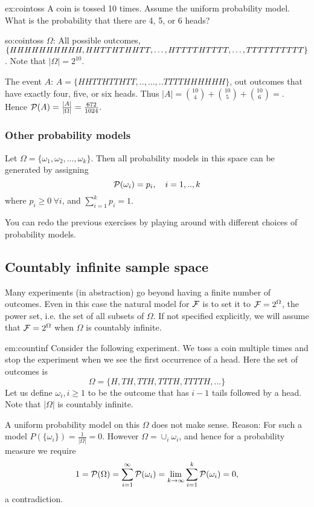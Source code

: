 \begin{excr}{ex:cointoss}
A coin is tossed 10 times. Assume the uniform probability model. What is the probability that there are 4, 5, or 6 heads?
\end{excr}
\begin{soln}{so:cointoss}
$\Omega$: All possible outcomes, $\{ HHHHHHHHHH, HHTTHTHHTT, \dots,\\ HTTTTHTTTT, \ldots, TTTTTTTTTT\}$. Note that $|\Omega|=2^{10}$.

The event $A$: $A=\{HHTTHTTHTT,..,\ldots,..TTTTHHHHHH \}$, out outcomes that have exactly four, five, or six heads. Thus $|A| = \binom{10}{4} + \binom{10}{5} + \binom{10}{6} = $.
Hence $\mathcal{P}(A) = \frac{|A|}{|\Omega|} = \frac{672}{1024}. $
\end{soln}

\subsubsection{Other probability models}

Let $\Omega=\{\omega_1, \omega_2, \ldots, \omega_k\}$. Then all probability models in this space can be generated by assigning
$$ \mathcal{P}(\omega_i)=p_i, ~~~i=1,..,k$$
where $p_i \geq 0 ~ \forall i$, and $\sum_{i=1}^k p_i = 1$.

You can redo the previous exercises by playing around with different choices of probability models.


\subsection{Countably infinite sample space}
Many experiments (in abstraction) go beyond having a finite number of outcomes. Even in this case the  natural model for $\mathcal{F}$ is to set it to $\mathcal{F}=2^\Omega$, the power set, i.e. the set of all subsets of $\Omega$. If not specified explicitly, we will assume that $\mathcal{F}=2^\Omega$ when $\Omega$ is countably infinite.

\begin{exmp}{em:countinf}
Consider the following experiment. We toss a coin multiple times and stop the experiment when we see the first occurrence of a head. Here the set of outcomes is
$$ \Omega = \{H, TH, TTH, TTTH, TTTTH,... \}$$
Let us define $\omega_i, i \geq 1$ to be the outcome that has $i-1$ tails followed by a head. Note that $|\Omega|$ is countably infinite.

A uniform probability model on this $\Omega$ does not make sense. Reason: For such a model $P(\{\omega_i\}) = \frac{1}{|\Omega|} = 0$. However $\Omega = \cup_i \omega_i$, and hence for a probability measure we require
$$ 1= \mathcal{P}(\Omega) = \sum_{i=1}^\infty \mathcal{P}(\omega_i) = \lim_{k \to \infty} \sum_{i=1}^k \mathcal{P}(\omega_i) = 0,$$
a contradiction. \end{exmp}


